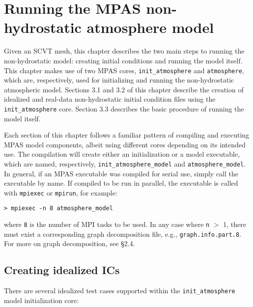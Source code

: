 
\chapter{Running the MPAS non-hydrostatic atmosphere model}
\label{chap:running_mpas_a}

\setlength\LTleft{0.0in}

Given an SCVT mesh, this chapter describes the two main steps to running the non-hydrostatic model: creating initial conditions and running the model itself.  This chapter makes use of two MPAS cores, {\tt init\_atmosphere} and {\tt atmosphere}, which are, respectively, used for initializing and running the non-hydrostatic atmospheric model.  Sections 3.1 and 3.2 of this chapter describe the creation of idealized and real-data non-hydrostatic initial condition files using the {\tt init\_atmosphere} core.   Section 3.3 describes the basic procedure of running the model itself.

Each section of this chapter follows a familiar pattern of compiling and executing MPAS model components, albeit using different cores depending on its intended use.  The compilation will create either an initialization or a model executable, which are named, respectively, {\tt init\_atmosphere\_model} and {\tt atmosphere\_model}.  In general, if an MPAS executable was compiled for serial use, simply call the executable by name. If compiled to be run in parallel, the executable is called with {\tt mpiexec} or {\tt mpirun}, for example:

\vspace{12pt}
{\tt > mpiexec -n 8 atmosphere\_model}
\vspace{12pt}


\noindent where {\tt 8} is the number of MPI tasks to be used.  In any case where {\tt n} $>$ 1, there must exist a corresponding graph decomposition file, e.g., {\tt graph.info.part.8}. For more on graph decomposition, see \S 2.4.  

\section{Creating idealized ICs}

There are several idealized test cases supported within the {\tt init\_atmosphere} model initialization core:

